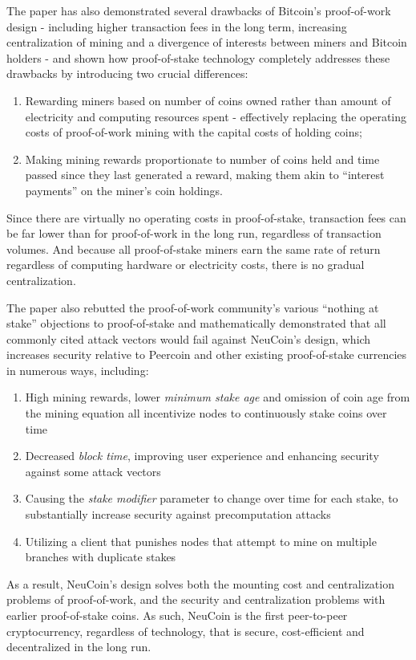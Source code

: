 \documentclass[a4paper,11pt]{article}
\begin{document}
The paper has also demonstrated several drawbacks of Bitcoin's proof-of-work design - including higher transaction fees in the long term, increasing centralization of mining and a divergence of interests between miners and Bitcoin holders - and shown how proof-of-stake technology completely addresses these drawbacks by introducing two crucial differences:
\begin{enumerate}
\setlength{\itemsep}{0pt}
\item{Rewarding miners based on number of coins owned rather than amount of electricity and computing resources spent - effectively replacing the operating costs of proof-of-work mining with the capital costs of holding coins;}
\item{Making mining rewards proportionate to number of coins held and time passed since they last generated a reward, making them akin to “interest payments” on the miner's coin holdings.}
\end{enumerate}   
Since there are virtually no operating costs in proof-of-stake, transaction fees can be far lower than for proof-of-work in the long run, regardless of transaction volumes. And because all proof-of-stake miners earn the same rate of return regardless of computing hardware or electricity costs, there is no gradual centralization. 
 
The paper also rebutted the proof-of-work community's various ``nothing at stake'' objections to proof-of-stake and mathematically demonstrated that all commonly cited attack vectors would fail against NeuCoin's design, which increases security relative to Peercoin and other existing proof-of-stake currencies in numerous ways, including:

\begin{enumerate}
\setlength{\itemsep}{0pt}
\item{High mining rewards, lower \textit{minimum stake age} and omission of coin age from the mining equation all incentivize nodes to continuously stake coins over time}
\item{Decreased \textit{\textit{block time}}, improving user experience and enhancing security against some attack vectors}
\item{Causing the \textit{stake modifier} parameter to change over time for each stake, to substantially increase security against precomputation attacks}
\item{Utilizing a client that punishes nodes that attempt to mine on multiple branches with duplicate stakes}
\end{enumerate}
 
As a result, NeuCoin's design solves both the mounting cost and centralization problems of proof-of-work, and the security and centralization problems with earlier proof-of-stake coins. As such, NeuCoin is the first peer-to-peer cryptocurrency, regardless of technology, that is secure, cost-efficient and decentralized in the long run.


\newpage



\end{document}
